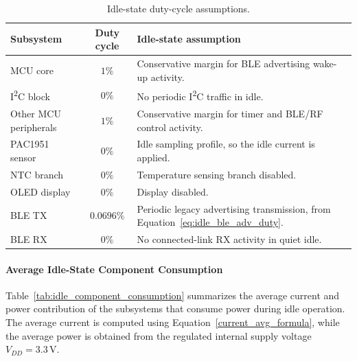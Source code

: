 \begin{table}[H]
	\centering
	\small
	\setlength{\tabcolsep}{7pt}
	\renewcommand{\arraystretch}{1.08}
	\caption{Idle-state duty-cycle assumptions.}
	\label{tab:idle_duty_cycle_summary}
	\begin{tabularx}{\textwidth}{@{}l c X@{}}
		\toprule
		\textbf{Subsystem} & \textbf{Duty cycle} & \textbf{Idle-state assumption} \\
		\midrule
		MCU core &
		\(1\%\) &
		Conservative margin for BLE advertising wake-up activity. \\
		
		I\textsuperscript{2}C block &
		\(0\%\) &
		No periodic I\textsuperscript{2}C traffic in idle. \\
		
		Other MCU peripherals &
		\(1\%\) &
		Conservative margin for timer and BLE/RF control activity. \\
		
		PAC1951 sensor &
		\(0\%\) &
		Idle sampling profile, so the idle current is applied. \\
		
		NTC branch &
		\(0\%\) &
		Temperature sensing branch disabled. \\
		
		OLED display &
		\(0\%\) &
		Display disabled. \\
		
		BLE TX &
		\(0.0696\%\) &
		Periodic legacy advertising transmission, from Equation~\ref{eq:idle_ble_adv_duty}. \\
		
		BLE RX &
		\(0\%\) &
		No connected-link RX activity in quiet idle. \\
		\bottomrule
	\end{tabularx}
\end{table}



\paragraph{Average Idle-State Component Consumption}
\label{sec:idle_component_consumption}

Table~\ref{tab:idle_component_consumption} summarizes the average current and power contribution of the subsystems that consume power during idle operation. 
The average current is computed using Equation~\ref{current_avg_formula}, while the average power is obtained from the regulated internal supply voltage \(V_{DD}=3.3\,\mathrm{V}\).

